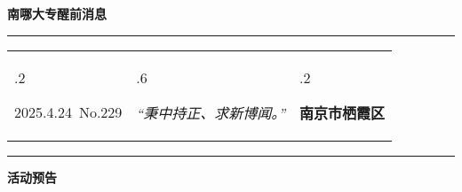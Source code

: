 \documentclass[letterpaper, 12pt]{article}
\begin{document}
\begin{center}
    \Huge\textbf{南哪大专醒前消息}
\end{center}
\vspace{4mm}
\hrule
\renewcommand\tabularxcolumn[1]{m{#1}}
\begin{tabularx}{\textwidth}{>{\hsize.2\hsize}X>{\hsize.6\hsize}X>{\hsize.2\hsize}X}
    \begin{flushleft}
        2025.4.24\, No.229
    \end{flushleft}
    &
    \begin{center}
        \textit{“秉中持正、求新博闻。”}
    \end{center}
    &
    \begin{flushright}
        \textbf{南京市栖霞区}
    \end{flushright}
\end{tabularx}
\vspace{-3.5mm}
\hrule
\vspace{4mm}
\centerline{\huge\textbf{活动预告}}
\end{document}

